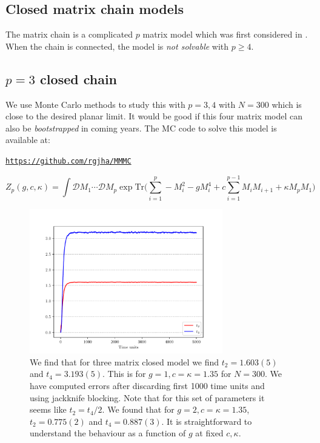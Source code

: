 \documentclass[11pt]{article}
\begin{document}
\subsection{Closed matrix chain models}

The matrix chain is a complicated $p$ matrix model which was first 
considered in \cite{Chadha:1980ri}. When the chain is connected, the 
model is \emph{not solvable} with $p \ge 4$. 



\subsection{$p=3$ closed chain} 

We use Monte Carlo methods to study this with $p = 3,4$ with 
$N = 300$ which is close to the desired planar limit. 
It would be good if this four matrix model can 
also be \textit{bootstrapped} in coming years. 
The MC code to solve this model is available at: 

\begin{center} \texttt{\href{https://github.com/rgjha/MMMC}{https://github.com/rgjha/MMMC}} \end{center}

\begin{equation}
	\label{eq:Mehta1} 
	Z_{p}(g,c,\kappa) = \int \mathcal{D}M_{1} \cdots  \mathcal{D}M_{p} \exp \mbox{Tr} \Bigg(\sum_{i=1}^{p} -M_{i}^2  - g M_{i}^{4} + c \sum_{i=1}^{p-1} M_{i}M_{i+1} 
	+ \kappa M_{p}M_{1} \Bigg)
\end{equation}


\begin{figure}[htbp] 
	\centering 
	\includegraphics[width=0.75\textwidth]{figs/3MM_closed.pdf}
	\caption{\label{fig:3MM_closed}We find that for three matrix closed model we find $t_{2} = 1.603(5)$ and $t_{4} = 3.193(5)$. 
	This is for $g=1, c=\kappa=1.35$ for $N=300$. We have computed errors after discarding first 1000 time units and 
	using jackknife blocking. Note that for this set of parameters it seems like $t_{2} = t_{4}/2$. We found that 
	for $g=2, c=\kappa=1.35$, $t_{2} = 0.775(2)$ and $t_{4} = 0.887(3)$. It is straightforward to understand the behaviour
	as a function of $g$ at fixed $c, \kappa$.}
\end{figure}
\end{document}
